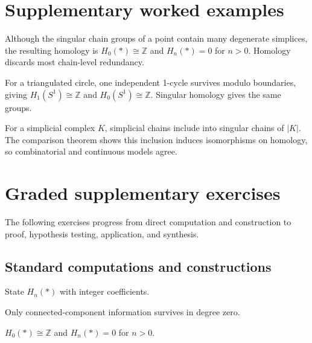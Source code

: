 \section{Supplementary worked examples}
\label{sec:viii17-pedagogy}

\begin{example}\label{ex:viii17-ped-01}
Although the singular chain groups of a point contain many degenerate simplices, the resulting homology is $H_0(*)\cong\mathbb Z$ and $H_n(*)=0$ for $n>0$.  Homology discards most chain-level redundancy.
\end{example}

\begin{example}\label{ex:viii17-ped-02}
For a triangulated circle, one independent 1-cycle survives modulo boundaries, giving $H_1(S^1)\cong\mathbb Z$ and $H_0(S^1)\cong\mathbb Z$.  Singular homology gives the same groups.
\end{example}

\begin{example}\label{ex:viii17-ped-03}
For a simplicial complex $K$, simplicial chains include into singular chains of $|K|$.  The comparison theorem shows this inclusion induces isomorphisms on homology, so combinatorial and continuous models agree.
\end{example}

\section{Graded supplementary exercises}
The following exercises progress from direct computation and construction to proof, hypothesis testing, application, and synthesis.

\subsection*{Standard computations and constructions}

\begin{exercise}\label{exr:viii17-ped-01}
State $H_n(*)$ with integer coefficients.
\end{exercise}
\begin{hint}
Only connected-component information survives in degree zero.
\end{hint}
\begin{solution}
$H_0(*)\cong\mathbb Z$ and $H_n(*)=0$ for $n>0$.
\end{solution}

